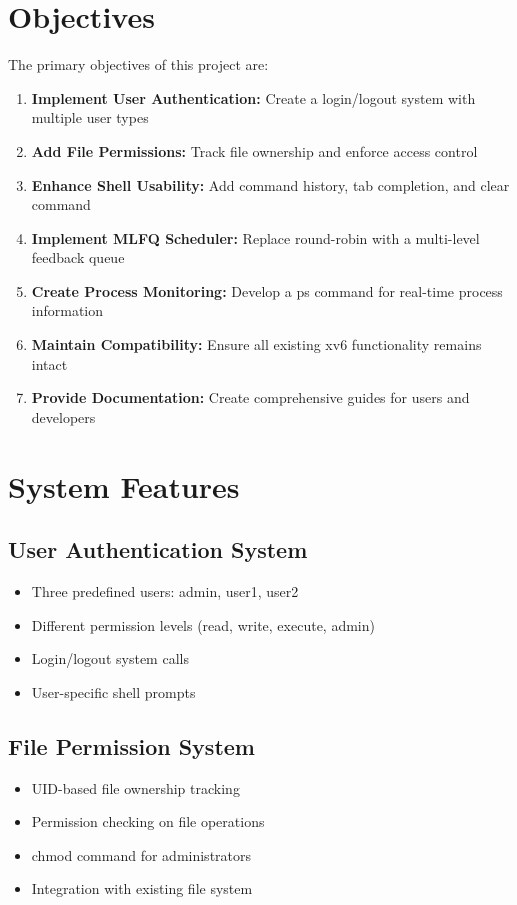 \documentclass[a4paper,12pt]{report}
\begin{document}
\section{Objectives}

The primary objectives of this project are:

\begin{enumerate}
    \item \textbf{Implement User Authentication:} Create a login/logout system with multiple user types
    \item \textbf{Add File Permissions:} Track file ownership and enforce access control
    \item \textbf{Enhance Shell Usability:} Add command history, tab completion, and clear command
    \item \textbf{Implement MLFQ Scheduler:} Replace round-robin with a multi-level feedback queue
    \item \textbf{Create Process Monitoring:} Develop a ps command for real-time process information
    \item \textbf{Maintain Compatibility:} Ensure all existing xv6 functionality remains intact
    \item \textbf{Provide Documentation:} Create comprehensive guides for users and developers
\end{enumerate}

\section{System Features}

\subsection{User Authentication System}
\begin{itemize}
    \item Three predefined users: admin, user1, user2
    \item Different permission levels (read, write, execute, admin)
    \item Login/logout system calls
    \item User-specific shell prompts
\end{itemize}

\subsection{File Permission System}
\begin{itemize}
    \item UID-based file ownership tracking
    \item Permission checking on file operations
    \item chmod command for administrators
    \item Integration with existing file system
\end{itemize}
\end{document}
